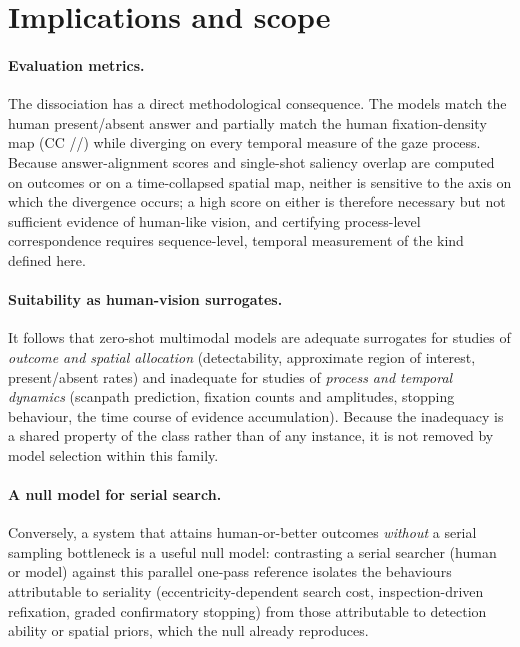 \documentclass[runningheads]{llncs}
\begin{document}
 
\section{Implications and scope}\label{sec:scope}
\paragraph{Evaluation metrics.} The dissociation has a direct methodological consequence. The models
match the human present/absent answer and partially match the human fixation-density map (CC
\QwenGPDensityCC/\GlmGPDensityCC/\GemmaGPDensityCC) while diverging on every temporal measure of the gaze
process. Because answer-alignment scores and single-shot saliency overlap are computed on outcomes or on
a time-collapsed spatial map, neither is sensitive to the axis on which the divergence occurs; a high
score on either is therefore necessary but not sufficient evidence of human-like vision, and certifying
process-level correspondence requires sequence-level, temporal measurement of the kind defined here.
 
\paragraph{Suitability as human-vision surrogates.} It follows that zero-shot multimodal models are
adequate surrogates for studies of \emph{outcome and spatial allocation} (detectability, approximate
region of interest, present/absent rates) and inadequate for studies of \emph{process and temporal
dynamics} (scanpath prediction, fixation counts and amplitudes, stopping behaviour, the time course of
evidence accumulation). Because the inadequacy is a shared property of the class rather than of any
instance, it is not removed by model selection within this family.
 
\paragraph{A null model for serial search.} Conversely, a system that attains human-or-better outcomes
\emph{without} a serial sampling bottleneck is a useful null model: contrasting a serial searcher (human
or model) against this parallel one-pass reference isolates the behaviours attributable to seriality
(eccentricity-dependent search cost, inspection-driven refixation, graded confirmatory stopping) from
those attributable to detection ability or spatial priors, which the null already reproduces.
 
\end{document}
